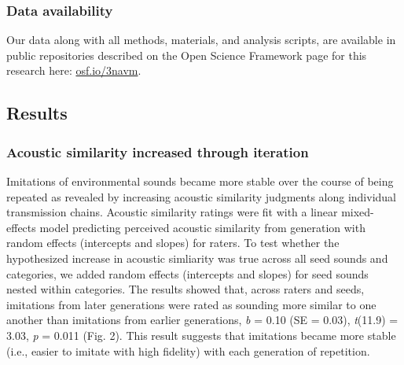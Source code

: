 \documentclass[english,floatsintext,man]{apa6}
\theoremstyle{definition}
\theoremstyle{definition}
\theoremstyle{remark}
\begin{document}
\subsubsection{Data availability}\label{data-availability}

Our data along with all methods, materials, and analysis scripts, are
available in public repositories described on the Open Science Framework
page for this research here: \href{https://osf.io/3navm}{osf.io/3navm}.

\subsection{Results}\label{results}

\subsubsection{Acoustic similarity increased through
iteration}\label{acoustic-similarity-increased-through-iteration}

Imitations of environmental sounds became more stable over the course of
being repeated as revealed by increasing acoustic similarity judgments
along individual transmission chains. Acoustic similarity ratings were
fit with a linear mixed-effects model predicting perceived acoustic
similarity from generation with random effects (intercepts and slopes)
for raters. To test whether the hypothesized increase in acoustic
simliarity was true across all seed sounds and categories, we added
random effects (intercepts and slopes) for seed sounds nested within
categories. The results showed that, across raters and seeds, imitations
from later generations were rated as sounding more similar to one
another than imitations from earlier generations, \emph{b} = 0.10 (SE =
0.03), \emph{t}(11.9) = 3.03, \emph{p} = 0.011 (Fig. 2). This result
suggests that imitations became more stable (i.e., easier to imitate
with high fidelity) with each generation of repetition.
\end{document}
